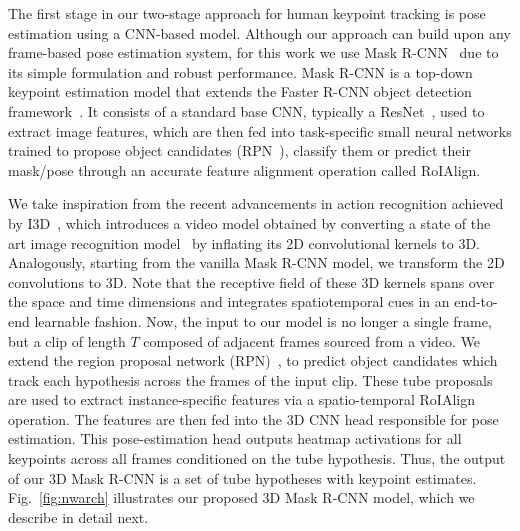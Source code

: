 \documentclass[10pt,twocolumn,letterpaper]{article}
\newcommand{\MODEL}[0]{3D Mask R-CNN}
\begin{document}
The first stage in our two-stage approach for human keypoint tracking is pose estimation using a CNN-based model. 
Although our approach can build upon any frame-based pose estimation system, for this work we use Mask R-CNN~\cite{he2017mask} due to its simple formulation and robust performance. Mask R-CNN is a top-down keypoint estimation model that extends the Faster R-CNN object detection framework~\cite{ren2015faster}. It consists of a standard base CNN, typically a ResNet~\cite{He15resnet}, used to extract image features, which are then fed into task-specific small neural networks trained to propose object candidates (RPN~\cite{ren2015faster}), classify them or predict their mask/pose through an accurate feature alignment operation called RoIAlign.

We take inspiration from the recent advancements in action recognition achieved by I3D~\cite{carreira2017quo}, which introduces a video model obtained by converting a state of the art image recognition model~\cite{ioffe2015batch} by inflating its 2D convolutional kernels to 3D.
Analogously, starting from the vanilla Mask R-CNN model, we transform the 2D convolutions to 3D.
Note that the receptive field of these 3D kernels spans over the space and time dimensions and integrates spatiotemporal cues in an end-to-end learnable fashion. Now, the input to our model is no longer a single frame, but a clip of length $T$ composed of adjacent frames sourced from a video. We extend the region proposal network (RPN)~\cite{ren2015faster}, to predict object candidates which track each hypothesis across the frames of the input clip. These tube proposals are used to extract instance-specific features via a spatio-temporal RoIAlign operation. The features are then fed into the 3D CNN head responsible for pose estimation. This pose-estimation head outputs heatmap activations for all keypoints across all frames conditioned on the tube hypothesis. Thus, the output of our \MODEL{} is a set of tube hypotheses with 
keypoint estimates.
Fig.~\ref{fig:nwarch} illustrates our proposed \MODEL{} model, which we describe in detail next.
\end{document}
